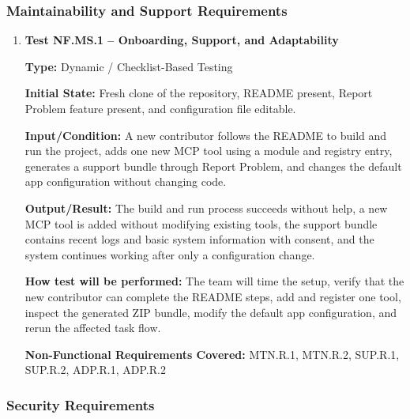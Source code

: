 \documentclass[12pt, titlepage]{article}
\begin{document}
\subsubsection{Maintainability and Support Requirements}

\begin{enumerate}

\item \textbf{Test NF.MS.1 -- Onboarding, Support, and Adaptability}

\textbf{Type:} Dynamic / Checklist-Based Testing

\textbf{Initial State:} Fresh clone of the repository, README present,
Report Problem feature present, and configuration file editable.

\textbf{Input/Condition:} A new contributor follows the README to build
and run the project, adds one new MCP tool using a module and registry
entry, generates a support bundle through Report Problem, and changes
the default app configuration without changing code.

\textbf{Output/Result:} The build and run process succeeds without help,
a new MCP tool is added without modifying existing tools, the support
bundle contains recent logs and basic system information with consent,
and the system continues working after only a configuration change.

\textbf{How test will be performed:} The team will time the setup,
verify that the new contributor can complete the README steps, add and
register one tool, inspect the generated ZIP bundle, modify the default
app configuration, and rerun the affected task flow.

\textbf{Non-Functional Requirements Covered:} MTN.R.1, MTN.R.2,
SUP.R.1, SUP.R.2, ADP.R.1, ADP.R.2

\end{enumerate}

\subsubsection{Security Requirements}
\end{document}
